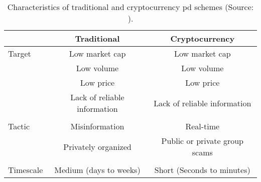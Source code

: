 \begin{table}[ht]
    \centering
    \begin{tabular}{l c c}
    \hline
     &\textbf{Traditional} & \textbf{Cryptocurrency}\\
    \hline
     Target   & Low market cap & Low market cap \\
              & Low volume     & Low volume \\
              & Low price      & Low price \\
              & Lack of reliable information & Lack of reliable information\\
              \\
    Tactic    & Misinformation & Real-time\\
              & Privately organized & Public or private group scams\\
              \\
    Timescale & Medium (days to weeks) & Short (Seconds to minutes)\\
    \hline
    \end{tabular}
    \caption[\acf{pd} characteristics]{Characteristics of traditional and cryptocurrency \ac{pd} schemes (Source: \cite{P&D_to_the_moon}). }
    \label{tab:pd_characteristics}
\end{table}